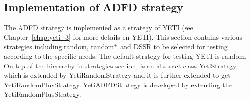 








\subsection{Implementation of ADFD strategy}\label{sec:implementation}
The ADFD strategy is implemented as a strategy of YETI (see Chapter~\ref{chap:yeti_3} for more details on YETI). This section contains various strategies including random, random$^+$ and DSSR to be selected for testing according to the specific needs. The default strategy for testing YETI is random. On top of the hierarchy in strategies section, is an abstract class YetiStrategy, which is extended by YetiRandomStrategy and it is further extended to get YetiRandomPlusStrategy. YetiADFDStrategy is developed by extending the YetiRandomPlusStrategy.

